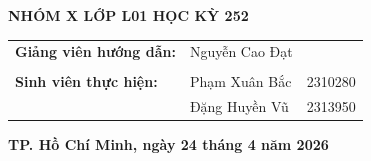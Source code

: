 \begin{titlepage}
\begin{center}
\begin{tabular}{c}
\hline
\end{tabular}
\end{center}
\begin{center}
    \textbf{\large NHÓM  X LỚP  L01 HỌC KỲ 252} \\
\end{center}

\vspace{0.5cm}
\begin{center}
\begin{table}[h]
\large
\begin{center}
\begin{tabular}{llc}
\textbf{Giảng viên hướng dẫn:} & Nguyễn Cao Đạt &\\
\\
\textbf{Sinh viên thực hiện:}
	& Phạm Xuân Bắc & 2310280\\
    & Đặng Huyền Vũ & 2313950 \\
\end{tabular}
\end{center}
 \centering
\end{table}
\vspace{0.5cm}
\begin{center}
\vspace{0.5cm}
{\footnotesize \textbf{TP. Hồ Chí Minh, ngày 24 tháng 4 năm 2026}}
\end{center}
\end{center}
\end{titlepage}